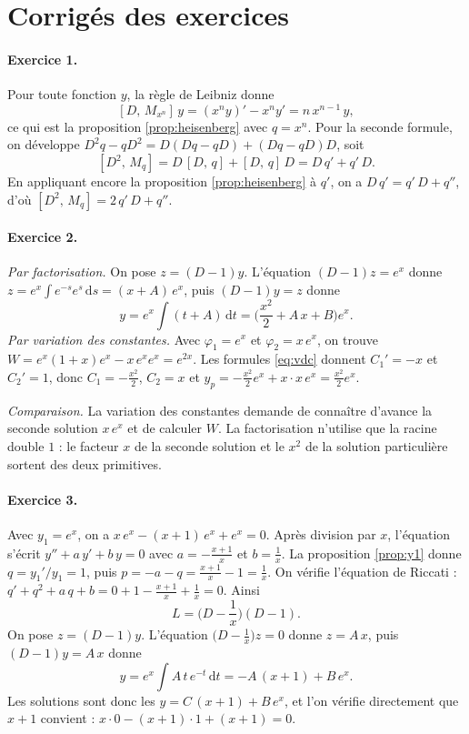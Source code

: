 \documentclass[11pt,a4paper]{article}
\theoremstyle{plain}
\theoremstyle{definition}
\theoremstyle{remark}
\newcommand{\Dx}{D}
\newcommand{\M}[1]{M_{#1}}
\newcommand{\cro}[2]{\left[#1,\,#2\right]}
\newcommand{\dd}{\mathrm{d}}
\begin{document}
\section{Corrigés des exercices}

\paragraph{Exercice 1.} Pour toute fonction $y$, la règle de Leibniz donne
\[
  \cro{\Dx}{\M{x^n}}\,y = (x^n y)' - x^n y' = n\,x^{n-1}\,y,
\]
ce qui est la proposition \ref{prop:heisenberg} avec $q = x^n$. Pour la seconde formule, on développe $\Dx^2 q - q\Dx^2 = \Dx(\Dx q - q\Dx) + (\Dx q - q\Dx)\Dx$, soit
\[
  \cro{\Dx^2}{\M{q}} = \Dx\,\cro{\Dx}{q} + \cro{\Dx}{q}\,\Dx = \Dx\,q' + q'\,\Dx .
\]
En appliquant encore la proposition \ref{prop:heisenberg} à $q'$, on a $\Dx\,q' = q'\,\Dx + q''$, d'où $\cro{\Dx^2}{\M{q}} = 2\,q'\,\Dx + q''$.

\paragraph{Exercice 2.} \emph{Par factorisation.} On pose $z = (\Dx - 1)y$. L'équation $(\Dx - 1)z = e^{x}$ donne $z = e^{x}\int e^{-s}e^{s}\,\dd s = (x + A)\,e^{x}$, puis $(\Dx - 1)y = z$ donne
\[
  y = e^{x}\!\int (t + A)\,\dd t = \Big(\frac{x^2}{2} + A\,x + B\Big)e^{x}.
\]
\emph{Par variation des constantes.} Avec $\varphi_1 = e^{x}$ et $\varphi_2 = x\,e^{x}$, on trouve $W = e^{x}(1+x)e^{x} - x\,e^{x}e^{x} = e^{2x}$. Les formules \eqref{eq:vdc} donnent $C_1' = -x$ et $C_2' = 1$, donc $C_1 = -\frac{x^2}{2}$, $C_2 = x$ et $y_p = -\frac{x^2}{2}e^{x} + x\cdot x\,e^{x} = \frac{x^2}{2}e^{x}$.

\emph{Comparaison.} La variation des constantes demande de connaître d'avance la seconde solution $x\,e^{x}$ et de calculer $W$. La factorisation n'utilise que la racine double $1$ : le facteur $x$ de la seconde solution et le $x^2$ de la solution particulière sortent des deux primitives.

\paragraph{Exercice 3.} Avec $y_1 = e^{x}$, on a $x\,e^{x} - (x+1)\,e^{x} + e^{x} = 0$. Après division par $x$, l'équation s'écrit $y'' + a\,y' + b\,y = 0$ avec $a = -\frac{x+1}{x}$ et $b = \frac1x$. La proposition \ref{prop:y1} donne $q = y_1'/y_1 = 1$, puis $p = -a - q = \frac{x+1}{x} - 1 = \frac1x$. On vérifie l'équation de Riccati : $q' + q^2 + a\,q + b = 0 + 1 - \frac{x+1}{x} + \frac1x = 0$. Ainsi
\[
  L = \Big(\Dx - \frac1x\Big)(\Dx - 1).
\]
On pose $z = (\Dx - 1)y$. L'équation $\big(\Dx - \frac1x\big)z = 0$ donne $z = A\,x$, puis $(\Dx - 1)y = A\,x$ donne
\[
  y = e^{x}\!\int A\,t\,e^{-t}\,\dd t = -A\,(x+1) + B\,e^{x}.
\]
Les solutions sont donc les $y = C\,(x+1) + B\,e^{x}$, et l'on vérifie directement que $x + 1$ convient : $x\cdot 0 - (x+1)\cdot 1 + (x+1) = 0$.
\end{document}
